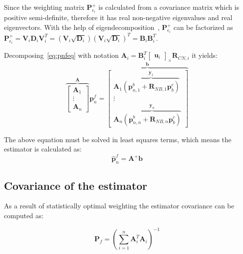 Since the weighting matrix $\mathbf{P}_{\epsilon_i}^{+}$ is calculated from a covariance matrix which is positive semi-definite, therefore it has real non-negative eigenvalues and real eigenvectors. With the help of eigendecomposition~\cite{matrixtheory}, $\mathbf{P}_{\epsilon_i}^{+}$ can be factorized as $\mathbf{P}_{\epsilon_i}^{+}=\mathbf{V}_i\mathbf{D}_i\mathbf{V}_i^T = (\mathbf{V}_i\sqrt{\mathbf{D}_i}){(\mathbf{V}_i\sqrt{\mathbf{D}_i})}^T = \mathbf{B}_i\mathbf{B}_i^T$.

Decomposing~\eqref{eq:pnfeq} with notation $\mathbf{A}_i=\mathbf{B}_i^T\begin{bmatrix} \mathbf{u}_i \end{bmatrix}_\times\mathbf{R}_{CN, i}$ it yields:
\begin{equation}
    \overbrace{
    \begin{bmatrix}
        \mathbf{A}_1 \\ \vdots \\ \mathbf{A}_n
    \end{bmatrix}
    }^{\mathbf{A}} \mathbf{p}_n^f =
    \overbrace{
    \begin{bmatrix}
        \mathbf{A}_1\overbrace{(\mathbf{p}_{n, 1}^b+\mathbf{R}_{NB, 1}\mathbf{p}_b^c)}^{\mathbf{y}_1} \\ \vdots \\ \mathbf{A}_n\overbrace{(\mathbf{p}_{n, n}^b+\mathbf{R}_{NB, n}\mathbf{p}_b^c)}^{\mathbf{y}_n}
    \end{bmatrix}
    }^{\mathbf{b}}
    \label{eq:decomposed-linsys}
\end{equation}

The above equation must be solved in least squares terms, which means the estimator is calculated as:
\begin{equation}
    \hat{\mathbf{p}}_n^f = \mathbf{A}^+\mathbf{b}
    \label{eq:estimator}
\end{equation}

\subsection{Covariance of the estimator}

As a result of statistically optimal weighting the estimator covariance can be computed as:

\begin{equation}
    \mathbf{P}_{f} = {\left(\sum_{i=1}^n \mathbf{A}_i^T\mathbf{A}_i\right)}^{-1}
    \label{eq:covest}
\end{equation}

